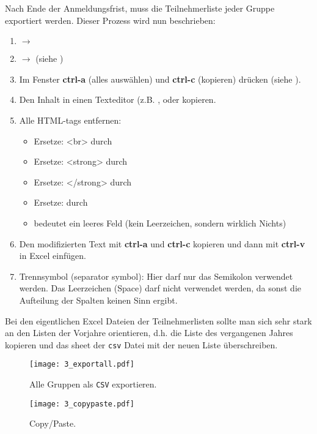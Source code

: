 Nach Ende der Anmeldungsfrist, muss die Teilnehmerliste jeder Gruppe exportiert
werden. Dieser Prozess wird nun beschrieben:
\begin{enumerate}
  \item {} $\to$  
  \item {} $\to$  (siehe )
  \item Im Fenster  {\bf ctrl-a} (alles auswählen) und 
    {\bf ctrl-c} (kopieren) drücken (siehe ).
 \item Den Inhalt in einen Texteditor (z.B. , 
    oder  kopieren.
 \item Alle HTML-tags entfernen:
    \begin{itemize}
      \item Ersetze: <br> durch 
      \item Ersetze: <strong> durch 
      \item Ersetze: </strong> durch 
      \item Ersetze: \grqq{} durch  \footnotemark[2]
      \item {} bedeutet ein leeres Feld (kein Leerzeichen, sondern
        wirklich Nichts)
    \end{itemize}
  \item Den modifizierten Text mit {\bf ctrl-a} und {\bf ctrl-c} kopieren und
    dann mit {\bf ctrl-v} in Excel einfügen.
  \item Trennsymbol (\glqq{}separator symbol\grqq{}): Hier darf nur das
    Semikolon verwendet werden. Das Leerzeichen (Space) darf nicht verwendet
    werden, da sonst die Aufteilung der Spalten keinen Sinn ergibt.
\end{enumerate}


Bei den eigentlichen Excel Dateien der Teilnehmerlisten sollte man sich sehr
stark an den Listen der Vorjahre orientieren, d.h. die Liste des vergangenen
Jahres kopieren und das sheet der {\tt csv} Datei mit der neuen Liste
überschreiben.

\begin{figure}[htbp]
\begin{center}
  \texttt{[image: 3\_exportall.pdf]}
  \caption{ Alle Gruppen als {\tt CSV} exportieren.}
  \label{fig:exportall}
\end{center}
\end{figure}

\begin{figure}[htbp]
\begin{center}
  \texttt{[image: 3\_copypaste.pdf]}
  \caption{ Copy/Paste.}
  \label{fig:copypaste}
\end{center}
\end{figure}


